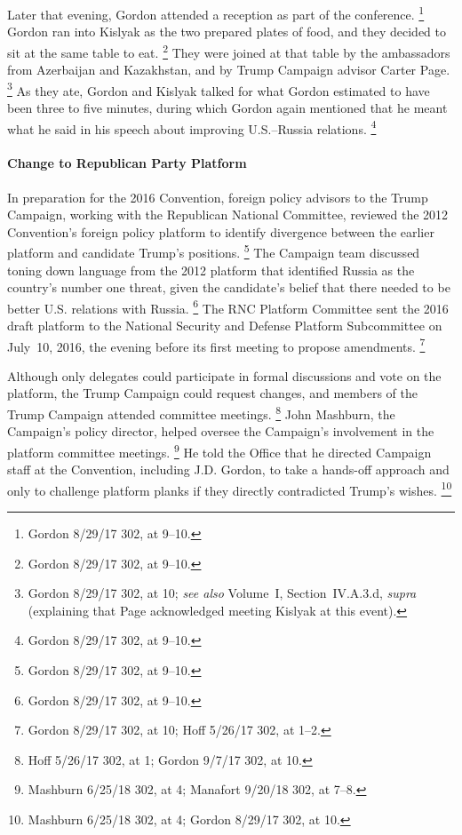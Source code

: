 Later that evening, Gordon attended a reception as part of the conference.%
\footnote{Gordon 8/29/17 302, at 9--10.}
Gordon ran into Kislyak as the two prepared plates of food, and they decided to sit at the same table to eat.%
\footnote{Gordon 8/29/17 302, at 9--10.}
They were joined at that table by the ambassadors from Azerbaijan and Kazakhstan, and by Trump Campaign advisor Carter Page.%
\footnote{Gordon 8/29/17 302, at 10;
\textit{see also} Volume~I, Section~IV.A.3.d, \textit{supra} (explaining that Page acknowledged meeting Kislyak at this event).
}
As they ate, Gordon and Kislyak talked for what Gordon estimated to have been three to five minutes, during which Gordon again mentioned that he meant what he said in his speech about improving U.S.--Russia relations.%
\footnote{Gordon 8/29/17 302, at 9--10.}

\paragraph{Change to Republican Party Platform}

In preparation for the 2016 Convention, foreign policy advisors to the Trump Campaign, working with the Republican National Committee, reviewed the 2012 Convention's foreign policy platform to identify divergence between the earlier platform and candidate Trump's positions.%
\footnote{Gordon 8/29/17 302, at 9--10.}
The Campaign team discussed toning down language from the 2012 platform that identified Russia as the country's number one threat, given the candidate's belief that there needed to be better U.S. relations with Russia.%
\footnote{Gordon 8/29/17 302, at 9--10.}
The RNC Platform Committee sent the 2016 draft platform to the National Security and Defense Platform Subcommittee on July~10, 2016, the evening before its first meeting to propose amendments.%
\footnote{Gordon 8/29/17 302, at 10;
Hoff 5/26/17 302, at 1--2.}

Although only delegates could participate in formal discussions and vote on the platform, the Trump Campaign could request changes, and members of the Trump Campaign attended committee meetings.%
\footnote{Hoff 5/26/17 302, at 1;
Gordon 9/7/17 302, at 10.}
John Mashburn, the Campaign's policy director, helped oversee the Campaign's involvement in the platform committee meetings.%
\footnote{Mashburn 6/25/18 302, at 4;
Manafort 9/20/18 302, at 7--8.}
He told the Office that he directed Campaign staff at the Convention, including J.D. Gordon, to take a hands-off approach and only to challenge platform planks if they directly contradicted Trump's wishes.%
\footnote{Mashburn 6/25/18 302, at 4;
Gordon 8/29/17 302, at 10.}

